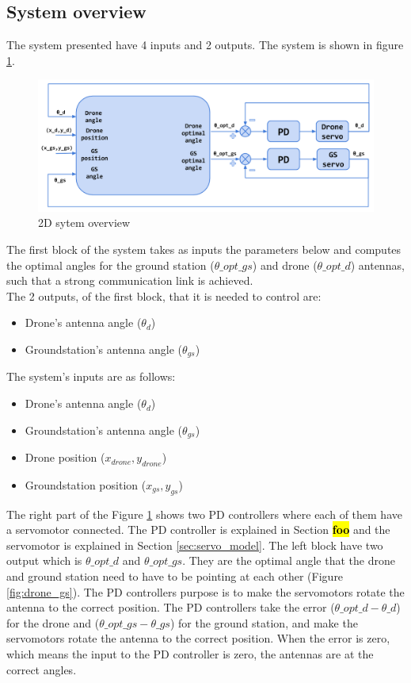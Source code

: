 \subsection{System overview}
The system presented have 4 inputs and 2 outputs. The system is shown in figure \ref{fig:2d_system}. 

\begin{figure}[h]
	\centering
	\includegraphics[scale=0.42]{figures/2d_system.png}
	\caption{2D sytem overview}
	\label{fig:2d_system}
\end{figure}
The first block of the system takes as inputs the parameters below and computes the optimal angles for the ground station ($\theta\_opt\_gs$) and drone ($\theta\_opt\_d$) antennas, such that a strong communication link is achieved. \\

\noindent The 2 outputs, of the first block, that it is needed to control are:
\begin{itemize}
	\item Drone's antenna angle ($\theta_{d}$)
	\item Groundstation's antenna angle ($\theta_{gs}$)
\end{itemize}

\noindent The system's inputs are as follows:
\begin{itemize}
	\item Drone's antenna angle ($\theta_{d}$)
	\item Groundstation's antenna angle ($\theta_{gs}$)
	\item Drone position ($x_{drone},y_{drone}$)
	\item Groundstation position ($x_{gs},y_{gs}$)
\end{itemize}   

The right part of the Figure \ref{fig:2d_system} shows two PD controllers where each of them have a servomotor connected. The PD controller is explained in Section \hl{\textbf{foo}}  and the servomotor is explained in Section \ref{sec:servo_model}. The left block have two output which is $\theta\_opt\_d$ and $\theta\_opt\_gs$. They are the optimal angle that the drone and ground station need to have to be pointing at each other (Figure \ref{fig:drone_gs}). The PD controllers purpose is to make the servomotors rotate the antenna to the correct position. The PD controllers take the error ($\theta\_opt\_d - \theta\_d$) for the drone and ($\theta\_opt\_gs - \theta\_gs$) for the ground station, and make the servomotors rotate the antenna to the correct position. When the error is zero, which means the input to the PD controller is zero, the antennas are at the correct angles.

